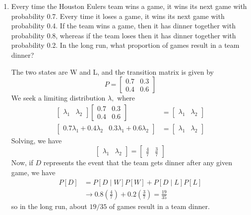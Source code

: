\documentclass{article}
\begin{document}
\begin{enumerate}
	\item Every time the Houston Eulers team wins a game, it wins its next game with probability 0.7. Every time it loses a game, it wins its next game with probability 0.4. If the team wins a game, then it has dinner together with probability 0.8, whereas if the team loses then it has dinner together with probability 0.2. In the long run, what proportion of games result in a team dinner?
		\begin{soln}
			The two states are W and L, and the transition matrix is given by
			\[P=\begin{bmatrix}
					0.7 & 0.3 \\ 0.4 & 0.6
			\end{bmatrix}\]
			We seek a limiting distribution $\lambda,$ where
			\begin{align*}
				\begin{bmatrix}
					\lambda_1 & \lambda_2
				\end{bmatrix}\begin{bmatrix}
					0.7 & 0.3 \\ 0.4 & 0.6
				\end{bmatrix} &= \begin{bmatrix}
					\lambda_1 & \lambda_2
				\end{bmatrix} \\
				\begin{bmatrix}
					0.7\lambda_1+0.4\lambda_2 & 0.3\lambda_1+0.6\lambda_2
				\end{bmatrix}&=\begin{bmatrix}
					\lambda_1 & \lambda_2
				\end{bmatrix}
			\end{align*}
			Solving, we have
			\[\begin{bmatrix}
					\lambda_1 & \lambda_2
				\end{bmatrix} = \begin{bmatrix}
					\frac{4}{7} & \frac{3}{7}
			\end{bmatrix}\]
			Now, if $D$ represents the event that the team gets dinner after any given game, we have
			\begin{align*}
				P[D] &= P[D\mid W]P[W] + P[D\mid L]P[L] \\
				&\to 0.8\left( \frac{4}{7} \right) + 0.2\left( \frac{3}{7} \right) = \frac{19}{35}
			\end{align*}
			so in the long run, about $19/35$ of games result in a team dinner.
		\end{soln}


\end{enumerate}
\end{document}
